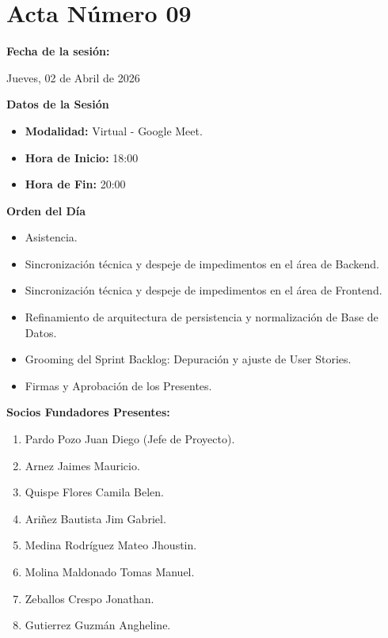 \newpage
\section{Acta Número 09}
\label{sec:acta09}

\noindent \textbf{Fecha de la sesión:}\par
Jueves, 02 de Abril de 2026

\vspace*{0.5cm}
\noindent \textbf{Datos de la Sesión}
\vspace*{-0.2cm}
\begin{itemize}[noitemsep]
    \item \textbf{Modalidad:} Virtual - Google Meet.
    \item \textbf{Hora de Inicio:} 18:00
    \item \textbf{Hora de Fin:} 20:00
\end{itemize}

\vspace*{0.5cm}
\noindent \textbf{Orden del Día}
\vspace{-0.2cm}
\begin{itemize}[noitemsep]
    \item Asistencia. 
    \item Sincronización técnica y despeje de impedimentos en el área de Backend. 
    \item Sincronización técnica y despeje de impedimentos en el área de Frontend. 
    \item Refinamiento de arquitectura de persistencia y normalización de Base de Datos. 
    \item Grooming del Sprint Backlog: Depuración y ajuste de User Stories. 
    \item Firmas y Aprobación de los Presentes.
\end{itemize}

\vspace*{0.5cm}
\noindent \textbf{Socios Fundadores Presentes:}
\vspace{-0.2cm}
\begin{enumerate}[noitemsep]
    \item Pardo Pozo Juan Diego (Jefe de Proyecto).
    \item Arnez Jaimes Mauricio.
    \item Quispe Flores Camila Belen.
    \item Ariñez Bautista Jim Gabriel.
    \item Medina Rodríguez Mateo Jhoustin.
    \item Molina Maldonado Tomas Manuel.
    \item Zeballos Crespo Jonathan.
    \item Gutierrez Guzmán Angheline.
\end{enumerate}

